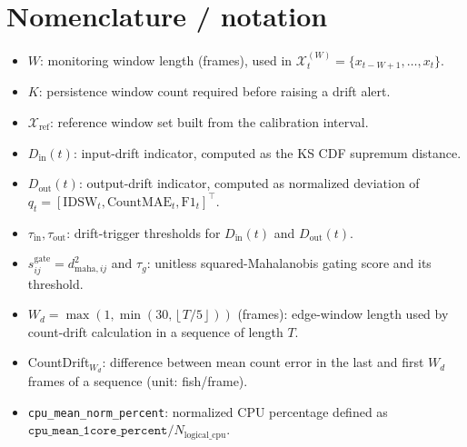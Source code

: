 \documentclass[5p,twocolumn,a4paper]{elsarticle}
\begin{document}
\section*{Nomenclature / notation}
\begin{itemize}
  \item $W$: monitoring window length (frames), used in $\mathcal{X}_t^{(W)}=\{x_{t-W+1},\ldots,x_t\}$.
  \item $K$: persistence window count required before raising a drift alert.
  \item $\mathcal{X}_{\mathrm{ref}}$: reference window set built from the calibration interval.
  \item $D_{\mathrm{in}}(t)$: input-drift indicator, computed as the \textsc{KS} \textsc{CDF} supremum distance.
  \item $D_{\mathrm{out}}(t)$: output-drift indicator, computed as normalized deviation of $q_t=[\mathrm{IDSW}_t,\mathrm{CountMAE}_t,\mathrm{F1}_t]^\top$.
  \item $\tau_{\mathrm{in}}, \tau_{\mathrm{out}}$: drift-trigger thresholds for $D_{\mathrm{in}}(t)$ and $D_{\mathrm{out}}(t)$.
  \item $s^{\mathrm{gate}}_{ij}=d^2_{\mathrm{maha},ij}$ and $\tau_g$: unitless squared-Mahalanobis gating score and its threshold.
  \item $W_d=\max\!\left(1,\min\!\left(30,\left\lfloor T/5 \right\rfloor\right)\right)$ (frames): edge-window length used by count-drift calculation in a sequence of length $T$.
  \item CountDrift$_{W_d}$: difference between mean count error in the last and first $W_d$ frames of a sequence (unit: fish/frame).
  \item \texttt{cpu\_mean\_norm\_percent}: normalized CPU percentage defined as $\texttt{cpu\_mean\_1core\_percent}/N_{\mathrm{logical\_cpu}}$.
\end{itemize}
\end{document}
